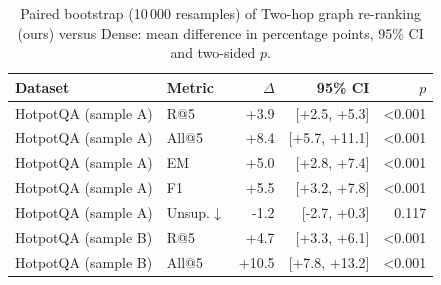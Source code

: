 \begin{table}[t]
\centering
\small
\caption{Paired bootstrap (10\,000 resamples) of Two-hop graph re-ranking (ours) versus Dense: mean difference in percentage points, 95\% CI and two-sided $p$.}
\label{tab:signif}
\begin{tabular}{llrrr}
\toprule
Dataset & Metric & $\Delta$ & 95\% CI & $p$ \\
\midrule
HotpotQA (sample A) & R@5 & +3.9 & [+2.5, +5.3] & <0.001 \\
HotpotQA (sample A) & All@5 & +8.4 & [+5.7, +11.1] & <0.001 \\
HotpotQA (sample A) & EM & +5.0 & [+2.8, +7.4] & <0.001 \\
HotpotQA (sample A) & F1 & +5.5 & [+3.2, +7.8] & <0.001 \\
HotpotQA (sample A) & Unsup.$\downarrow$ & -1.2 & [-2.7, +0.3] & 0.117 \\
HotpotQA (sample B) & R@5 & +4.7 & [+3.3, +6.1] & <0.001 \\
HotpotQA (sample B) & All@5 & +10.5 & [+7.8, +13.2] & <0.001 \\
\bottomrule
\end{tabular}
\end{table}